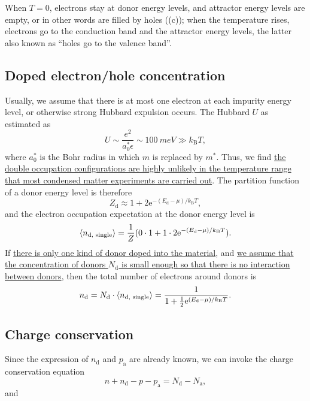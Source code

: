 \documentclass[hyperref, a4paper]{article}
\newcommand*{\ee}{\mathrm{e}}
\newcommand{\kB}{k_{\text{B}}}
\newcommand{\Ed}{E_{\text{d}}}
\newcommand{\nd}{n_{\text{d}}}
\newcommand{\Nd}{N_{\text{d}}}
\newcommand{\pa}{p_{\text{a}}}
\newcommand{\Na}{N_{\text{a}}}
\begin{document}
When $T = 0$, electrons stay at donor energy levels, 
and attractor energy levels are empty, 
or in other words are filled by holes ((c)); 
when the temperature rises, 
electrons go to the conduction band
and the attractor energy levels, 
the latter also known as ``holes go to the valence band''.

\subsection{Doped electron/hole concentration}

Usually, we assume that there is at most one electron at each impurity energy level, 
or otherwise strong Hubbard expulsion occurs.
The Hubbard $U$ as estimated as 
\begin{equation}
    U \sim \frac{e^2}{a_0^* \epsilon} \sim \SI{100}{meV} \gg \kB T,
\end{equation}
where $a_0^*$ is the Bohr radius 
in which $m$ is replaced by $m^*$.
Thus, we find \ul{the double occupation configurations 
are highly unlikely in the temperature range 
that most condensed matter experiments are carried out}.
The partition function of a donor energy level is therefore 
\begin{equation}
    Z_{\text{d}} \approx 1 + 2 \ee^{- (\Ed - \mu) / \kB T},
\end{equation}
and the electron occupation expectation at the donor energy level is 
\begin{equation}
    \expval{n_{\text{d, single}}} = \frac{1}{Z} (0 \cdot 1 + 1 \cdot 2 \ee^{- (\Ed - \mu) / \kB T}).
\end{equation}
If \ul{there is only one kind of donor doped into the material}, 
and \ul{we assume that the concentration of donors $\Nd$
is small enough so that there is no interaction between donors},
then the total number of electrons around donors is 
\begin{equation}
    \nd = \Nd \cdot \expval{n_{\text{d, single}}} 
    = \frac{1}{
        1 + \frac{1}{2} 
        \ee^{(\Ed - \mu) / \kB T}
    }.
\end{equation}

\subsection{Charge conservation}

Since the expression of $\nd$ and $\pa$ are already known, 
we can invoke the charge conservation equation 
\begin{equation}
    n + \nd - p - \pa = \Nd - \Na,
\end{equation}
and 
\end{document}
